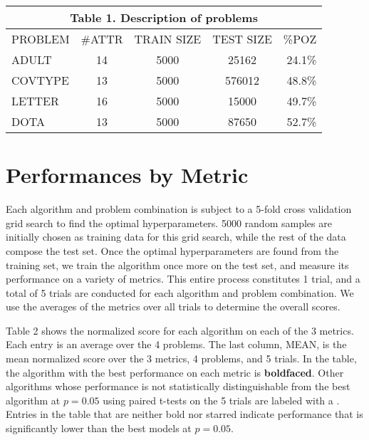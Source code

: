 \documentclass[twoside,11pt]{article}
\begin{document}
\begin{table}[htb]
\centering
\begin{tabular}{lcccr}
\multicolumn{5}{c}{Table 1. Description of problems}                                        \\ \hline
\multicolumn{1}{|l}{PROBLEM} & \#ATTR & TRAIN SIZE & TEST SIZE & \multicolumn{1}{r|}{\%POZ}  \\ \hline
\multicolumn{1}{|l}{ADULT}   & 14     & 5000       & 25162     & \multicolumn{1}{r|}{24.1\%} \\
\multicolumn{1}{|l}{COVTYPE} & 13     & 5000       & 576012    & \multicolumn{1}{r|}{48.8\%} \\
\multicolumn{1}{|l}{LETTER}  & 16     & 5000       & 15000     & \multicolumn{1}{r|}{49.7\%} \\
\multicolumn{1}{|l}{DOTA}    & 13     & 5000       & 87650     & \multicolumn{1}{r|}{52.7\%} \\ \hline
\end{tabular}
\end{table}

\section{Performances by Metric}
Each algorithm and problem combination is subject to a 5-fold cross validation grid search to find the optimal hyperparameters. 5000 random samples are initially chosen as training data for this grid search, while the rest of the data compose the test set. Once the optimal hyperparameters are found from the training set, we train the algorithm once more on the test set, and measure its performance on a variety of metrics. This entire process constitutes 1 trial, and a total of 5 trials are conducted for each algorithm and problem combination. We use the averages of the metrics over all trials to determine the overall scores.

Table 2 shows the normalized score for each algorithm on each of the 3 metrics. Each entry is an average over the 4 problems. The last column, MEAN, is the mean normalized score over the 3 metrics, 4 problems, and 5 trials. In the table, the algorithm with the best performance on each metric is {\bf boldfaced}. Other algorithms whose performance is not statistically distinguishable from the best algorithm at $p = 0.05$ using paired t-tests on the 5 trials are labeled with a {\bf *}. Entries in the table that are neither bold nor starred indicate performance that is significantly lower than the best models at $p = 0.05$.
\end{document}
